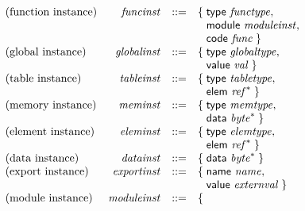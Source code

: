 $$
\begin{array}{@{}lrrl@{}l@{}}
\mbox{(function instance)} & {\mathit{funcinst}} &::=& \{\; \begin{array}[t]{@{}l@{}l@{}}
\mathsf{type}~{\mathit{functype}},\; \\
  \mathsf{module}~{\mathit{moduleinst}},\; \\
  \mathsf{code}~{\mathit{func}} \;\}\end{array} \\
\mbox{(global instance)} & {\mathit{globalinst}} &::=& \{\; \begin{array}[t]{@{}l@{}l@{}}
\mathsf{type}~{\mathit{globaltype}},\; \\
  \mathsf{value}~{\mathit{val}} \;\}\end{array} \\
\mbox{(table instance)} & {\mathit{tableinst}} &::=& \{\; \begin{array}[t]{@{}l@{}l@{}}
\mathsf{type}~{\mathit{tabletype}},\; \\
  \mathsf{elem}~{{\mathit{ref}}^\ast} \;\}\end{array} \\
\mbox{(memory instance)} & {\mathit{meminst}} &::=& \{\; \begin{array}[t]{@{}l@{}l@{}}
\mathsf{type}~{\mathit{memtype}},\; \\
  \mathsf{data}~{{\mathit{byte}}^\ast} \;\}\end{array} \\
\mbox{(element instance)} & {\mathit{eleminst}} &::=& \{\; \begin{array}[t]{@{}l@{}l@{}}
\mathsf{type}~{\mathit{elemtype}},\; \\
  \mathsf{elem}~{{\mathit{ref}}^\ast} \;\}\end{array} \\
\mbox{(data instance)} & {\mathit{datainst}} &::=& \{\; \begin{array}[t]{@{}l@{}l@{}}
\mathsf{data}~{{\mathit{byte}}^\ast} \;\}\end{array} \\
\mbox{(export instance)} & {\mathit{exportinst}} &::=& \{\; \begin{array}[t]{@{}l@{}l@{}}
\mathsf{name}~{\mathit{name}},\; \\
  \mathsf{value}~{\mathit{externval}} \;\}\end{array} \\
\mbox{(module instance)} & {\mathit{moduleinst}} &::=& \{\; \begin{array}[t]{@{}l@{}l@{}}

\end{array}
\end{array}$$
